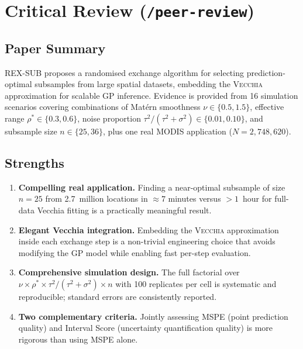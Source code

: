 \documentclass[12pt, a4paper]{article}
\newcommand{\Vecchia}{\textsc{Vecchia}}
\begin{document}
\section{Critical Review (\texttt{/peer-review})}

\subsection{Paper Summary}

REX-SUB proposes a randomised exchange algorithm for selecting prediction-optimal
subsamples from large spatial datasets, embedding the \Vecchia{} approximation for
scalable GP inference.  Evidence is provided from 16 simulation scenarios covering
combinations of Matérn smoothness $\nu \in \{0.5, 1.5\}$, effective range
$\rho^* \in \{0.3, 0.6\}$, noise proportion $\tau^2/(\tau^2 + \sigma^2) \in
\{0.01, 0.10\}$, and subsample size $n \in \{25, 36\}$, plus one real MODIS
application ($N = 2{,}748{,}620$).

\subsection{Strengths}

\begin{enumerate}[label=\textbf{S\arabic*.}, leftmargin=2.5em]
  \item \textbf{Compelling real application.}  Finding a near-optimal subsample of
    size $n=25$ from 2.7~million locations in $\approx 7$ minutes versus $>1$~hour
    for full-data Vecchia fitting is a practically meaningful result.

  \item \textbf{Elegant Vecchia integration.}  Embedding the \Vecchia{}
    approximation inside each exchange step is a non-trivial engineering choice that
    avoids modifying the GP model while enabling fast per-step evaluation.

  \item \textbf{Comprehensive simulation design.}  The full factorial over
    $\nu \times \rho^* \times \tau^2/(\tau^2+\sigma^2) \times n$ with 100 replicates
    per cell is systematic and reproducible; standard errors are consistently
    reported.

  \item \textbf{Two complementary criteria.}  Jointly assessing MSPE (point
    prediction quality) and Interval Score (uncertainty quantification quality)
    is more rigorous than using MSPE alone.
\end{enumerate}
\end{document}
